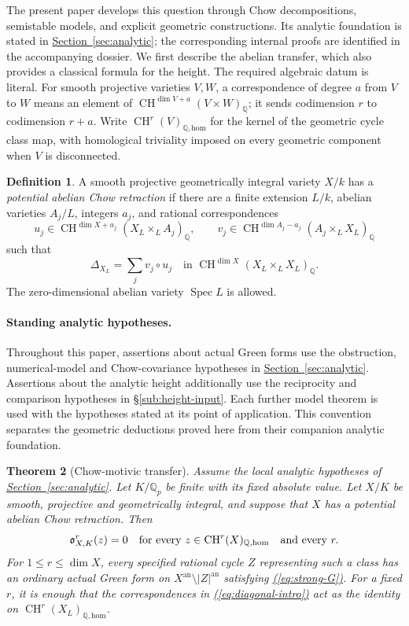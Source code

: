 \documentclass[11pt,a4paper]{article}
\newtheorem{theorem}{Theorem}[section]
\theoremstyle{definition}
\newtheorem{definition}[theorem]{Definition}
\theoremstyle{remark}\newtheorem{remark}[theorem]{Remark}
\numberwithin{equation}{section}
\newcommand{\Q}{\mathbb Q}\newcommand{\R}{\mathbb R}\newcommand{\C}{\mathbb C}
\newcommand{\CH}{\operatorname{CH}}\newcommand{\an}{\mathrm{an}}
\newcommand{\homol}{\mathrm{hom}}\newcommand{\BC}{\mathrm{BC}}
\newcommand{\Spec}{\operatorname{Spec}}\newcommand{\Bl}{\operatorname{Bl}}
\newcommand{\secref}[1]{\hyperref[#1]{\textcolor{sectionlink}{Section~\ref*{#1}}}}
\newcommand{\subref}[1]{\hyperref[#1]{\textcolor{sectionlink}{\S\ref*{#1}}}}
\renewcommand{\eqref}[1]{\hyperref[#1]{\textcolor{equationlink}{(\ref*{#1})}}}
\begin{document}
The present paper develops this question through Chow decompositions,
semistable models, and explicit geometric constructions. Its analytic
foundation is stated in \secref{sec:analytic}; the corresponding internal
proofs are identified in the accompanying dossier. We first describe the
abelian transfer, which also provides a classical formula for the height.
The required algebraic datum is literal.
For smooth projective varieties $V,W$, a correspondence of degree $a$ from
$V$ to $W$ means an element of
$\CH^{\dim V+a}(V\times W)_\Q$; it sends codimension $r$ to codimension
$r+a$. Write $\CH^r(V)_{\Q,\homol}$ for the kernel of the geometric
cycle class map, with homological triviality imposed on every geometric
component when $V$ is disconnected.

\begin{definition}\label{def:abelian-retraction}
A smooth projective geometrically integral variety $X/k$ has a
\emph{potential abelian Chow retraction} if there are a finite extension
$L/k$, abelian varieties $A_j/L$, integers $a_j$, and rational
correspondences
\[
 u_j\in\CH^{\dim X+a_j}(X_L\times_L A_j)_\Q,
 \qquad
 v_j\in\CH^{\dim A_j-a_j}(A_j\times_L X_L)_\Q
\]
such that
\begin{equation}\label{eq:diagonal-intro}
       \Delta_{X_L}=\sum_j v_j\circ u_j
       \quad\text{in }\CH^{\dim X}(X_L\times_L X_L)_\Q.
\end{equation}
The zero-dimensional abelian variety $\Spec L$ is allowed.
\end{definition}

\paragraph{Standing analytic hypotheses.}
Throughout this paper, assertions about actual Green forms use the
obstruction, numerical-model and Chow-covariance hypotheses in
\secref{sec:analytic}. Assertions about the analytic height additionally
use the reciprocity and comparison hypotheses in \subref{sub:height-input}.
Each further model theorem is used with the hypotheses stated at its point
of application. This convention separates the geometric deductions proved
here from their companion analytic foundation.

\begin{theorem}[Chow-motivic transfer]\label{thm:main}
Assume the local analytic hypotheses of \secref{sec:analytic}.
Let $K/\Q_p$ be finite with its fixed absolute value. Let $X/K$ be smooth,
projective and geometrically integral, and suppose that $X$ has a potential
abelian Chow retraction. Then
\[
 \ob^r_{X,K}(z)=0
 \quad\text{for every }z\in\CH^r(X)_{\Q,\homol}
 \quad\text{and every }r.
\]
For $1\le r\le\dim X$, every specified rational cycle $Z$ representing
such a class has an ordinary actual Green form on
$X^{\an}\setminus |Z|^{\an}$ satisfying \eqref{eq:strong-G}.
For a fixed $r$, it is enough that the correspondences in
\eqref{eq:diagonal-intro} act as the identity on
$\CH^r(X_L)_{\Q,\homol}$.
\end{theorem}
\end{document}
